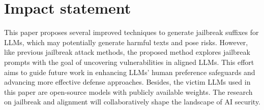 \section{Impact statement}
This paper proposes several improved techniques to generate jailbreak suffixes for LLMs, which may potentially generate harmful texts and pose risks. However, like previous jailbreak attack methods, the proposed method explores jailbreak prompts with the goal of uncovering vulnerabilities in aligned LLMs. This effort aims to guide future work in enhancing LLMs' human preference safeguards and advancing more effective defense approaches. Besides, the victim LLMs used in this paper are open-source models with publicly available weights. The research on jailbreak and alignment will collaboratively shape the landscape of AI security. 




